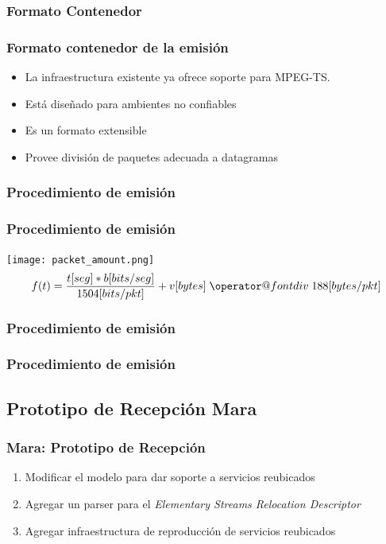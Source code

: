 \documentclass[a4paper,11pt]{beamer}
\makeatletter
\newcommand*{\bdiv}{%
  \nonscript\mskip-\medmuskip\mkern5mu%
  \mathbin{\operator@font div}\penalty900\mkern5mu%
  \nonscript\mskip-\medmuskip
}
\makeatother
\begin{document}
		\subsubsection{Formato Contenedor}
		\begin{frame}
			\frametitle{Formato contenedor de la emisión}
			\begin{itemize}
				\item La infraestructura existente ya ofrece soporte para MPEG-TS.
				\item Está diseñado para ambientes no confiables
				\item Es un formato extensible
				\item Provee división de paquetes adecuada a datagramas
			\end{itemize}
		\end{frame}
		
		\subsubsection{Procedimiento de emisión}
			\begin{frame}
			\frametitle{Procedimiento de emisión}
			\begin{center}
			\texttt{[image: packet\_amount.png]}
			$$f(t) = \frac{t[seg] * b[bits/seg]}{1504[bits/pkt]} + v[bytes] \bdiv 188[bytes/pkt] $$
			\end{center}
		\end{frame}

		\subsubsection{Procedimiento de emisión}
			\begin{frame}
			\frametitle{Procedimiento de emisión}
			\resizebox{\textwidth}{!}{
				
			}
		\end{frame}

	\subsection{Prototipo de Recepción Mara}
		\begin{frame}
			\frametitle{Mara: Prototipo de Recepción}
			\begin{enumerate}
				\item Modificar el modelo para dar soporte a servicios reubicados
				\item Agregar un parser para el \emph{Elementary Streams Relocation Descriptor}
				\item Agregar infraestructura de reproducción de servicios reubicados
			\end{enumerate}
		\end{frame}
\end{document}
